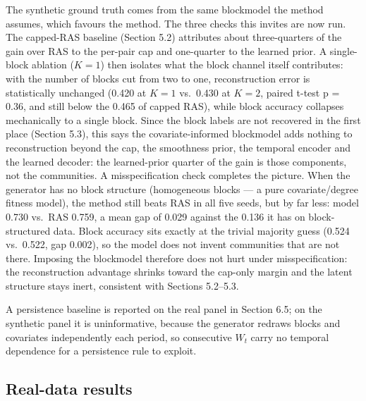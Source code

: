 \documentclass[
  a4paper,
]{article}
\begin{document}
The synthetic ground truth comes from the same blockmodel the method
assumes, which favours the method. The three checks this invites are now
run. The capped-RAS baseline (Section 5.2) attributes about
three-quarters of the gain over RAS to the per-pair cap and one-quarter
to the learned prior. A single-block ablation (\(K=1\)) then isolates
what the block channel itself contributes: with the number of blocks cut
from two to one, reconstruction error is statistically unchanged (0.420
at \(K=1\) vs.~0.430 at \(K=2\), paired t-test p = 0.36, and still below
the 0.465 of capped RAS), while block accuracy collapses mechanically to
a single block. Since the block labels are not recovered in the first
place (Section 5.3), this says the covariate-informed blockmodel adds
nothing to reconstruction beyond the cap, the smoothness prior, the
temporal encoder and the learned decoder: the learned-prior quarter of
the gain is those components, not the communities. A misspecification
check completes the picture. When the generator has no block structure
(homogeneous blocks --- a pure covariate/degree fitness model), the
method still beats RAS in all five seeds, but by far less: model 0.730
vs.~RAS 0.759, a mean gap of 0.029 against the 0.136 it has on
block-structured data. Block accuracy sits exactly at the trivial
majority guess (0.524 vs.~0.522, gap 0.002), so the model does not
invent communities that are not there. Imposing the blockmodel therefore
does not hurt under misspecification: the reconstruction advantage
shrinks toward the cap-only margin and the latent structure stays inert,
consistent with Sections 5.2--5.3.

A persistence baseline is reported on the real panel in Section 6.5; on
the synthetic panel it is uninformative, because the generator redraws
blocks and covariates independently each period, so consecutive \(W_t\)
carry no temporal dependence for a persistence rule to exploit.

\subsection{Real-data results}\label{real-data-results}
\end{document}

